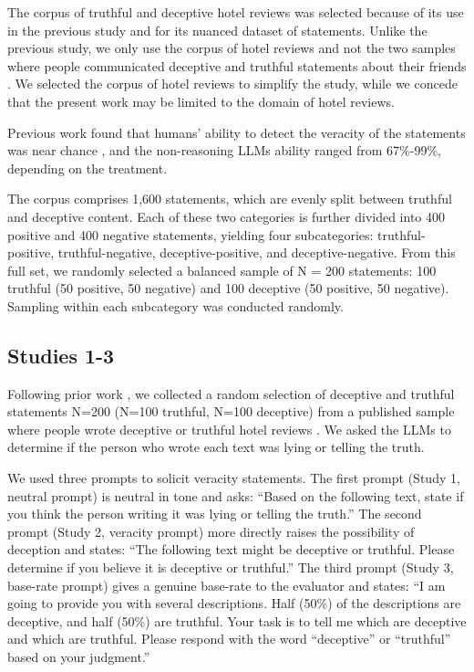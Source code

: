 \documentclass{article}
\begin{document}
The corpus of truthful and deceptive hotel reviews \citep{ott_finding_2011} was selected because of its use in the previous study \citep{markowitz_generative_2024} and for its nuanced dataset of statements. Unlike the previous study, we only use the corpus of hotel reviews \citep{ott_finding_2011} and not the two samples where people communicated deceptive and truthful statements about their friends \citep{markowitz_when_2020, lloyd_miami_2019}. We selected the corpus of hotel reviews to simplify the study, while we concede that the present work may be limited to the domain of hotel reviews.

Previous work \citep{markowitz_generative_2024} found that humans' ability to detect the veracity of the statements was near chance \citep{markowitz_generative_2024}, and the non-reasoning LLMs ability ranged from 67\%-99\%, depending on the treatment.

The corpus comprises 1,600 statements, which are evenly split between truthful and deceptive content. Each of these two categories is further divided into 400 positive and 400 negative statements, yielding four subcategories: truthful-positive, truthful-negative, deceptive-positive, and deceptive-negative. From this full set, we randomly selected a balanced sample of N = 200 statements: 100 truthful (50 positive, 50 negative) and 100 deceptive (50 positive, 50 negative). Sampling within each subcategory was conducted randomly.


\subsection{Studies 1-3}

Following prior work \citep{markowitz_generative_2024}, we collected a random selection of deceptive and truthful statements N=200 (N=100 truthful, N=100 deceptive) from a published sample where people wrote deceptive or truthful hotel reviews \citep{ott_finding_2011}. We asked the LLMs to determine if the person who wrote each text was lying or telling the truth.

We used three prompts to solicit veracity statements. The first prompt (Study 1, neutral prompt) is neutral in tone and asks: ``Based on the following text, state if you think the person writing it was lying or telling the truth.'' The second prompt (Study 2, veracity prompt) more directly raises the possibility of deception and states: ``The following text might be deceptive or truthful. Please determine if you believe it is deceptive or truthful.'' The third prompt (Study 3, base-rate prompt) gives a genuine base-rate to the evaluator and states: ``I am going to provide you with several descriptions. Half (50\%) of the descriptions are deceptive, and half (50\%) are truthful. Your task is to tell me which are deceptive and which are truthful. Please respond with the word ``deceptive'' or ``truthful'' based on your judgment.''
\end{document}
